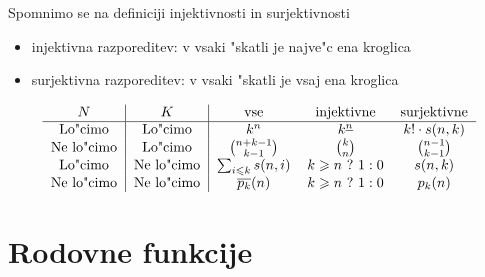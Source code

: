 \documentclass[a4paper,12pt]{article}
\theoremstyle{definition}
\theoremstyle{remark}
\newtheorem*{ex}{Primer}
\begin{document}
Spomnimo se na definiciji injektivnosti in surjektivnosti
\begin{itemize}
    \item injektivna razporeditev: v vsaki "skatli je najve"c ena kroglica
    \item surjektivna razporeditev: v vsaki "skatli je vsaj ena kroglica
\end{itemize}
\[\begin{tabular}{c|c|c c c}
    $N$ & $K$ & vse & injektivne & surjektivne \\
\hline
    Lo"cimo & Lo"cimo & $k^n$ & $k^{\underline{n}}$ & $k!\cdot s(n, k)$\\
    Ne lo"cimo & Lo"cimo & $\binom{n + k - 1}{k - 1}$ & $\binom{k}{n}$ & $\binom{n - 1}{k - 1}$\\
    Lo"cimo & Ne lo"cimo & $\sum_{i \leqslant k} s(n, i)$ & $k \geqslant n \ ? \ 1 : 0$ & $s(n, k)$\\
    Ne lo"cimo & Ne lo"cimo & $\overline{p_k}(n)$ & $k \geqslant n \ ? \ 1:0$ & $p_k(n)$ \\
\end{tabular}\]



%

\section{Rodovne funkcije}
\end{document}
